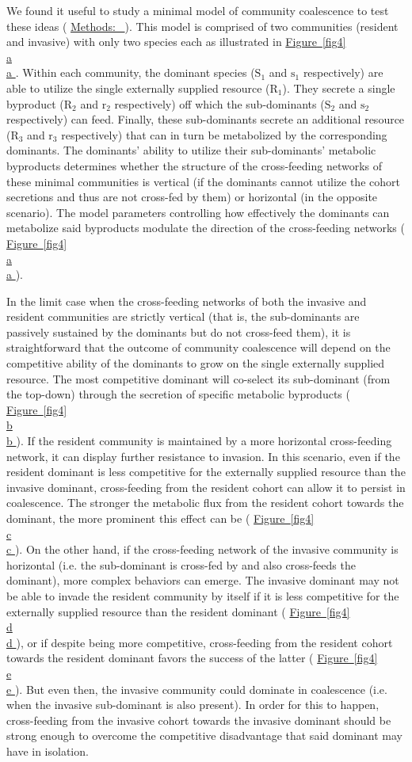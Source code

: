 \documentclass[a4paper,10pt]{article}
\newcommand{\figref}[2][]{%
  \hyperref[{#2}]{%
    Figure~\ref*{#2}%
    \ifx\\#1\\%
    \else
      #1%
    \fi
  }%
}
\newcommand{\methodsref}[1]{%
  \hyperref[{methods:#1}]{%
   Methods:~\nameref*{methods:#1}%
  }%
}
\begin{document}
We found it useful to study a minimal model of community coalescence
to test these ideas
(\methodsref{sim-min}).
This model is comprised of two communities
(resident and invasive)
with only two species each
as illustrated in \figref[a]{fig4}.
Within each community, the dominant species
($\mathrm{S}_1$ and $\mathrm{s}_1$ respectively)
are able to utilize the single externally supplied resource ($\mathrm{R}_1$).
They secrete a single byproduct
($\mathrm{R}_2$ and $\mathrm{r}_2$ respectively)
off which
the sub-dominants ($\mathrm{S}_2$ and $\mathrm{s}_2$ respectively) can feed.
Finally, these sub-dominants secrete an additional resource
($\mathrm{R}_3$ and $\mathrm{r}_3$ respectively)
that can in turn
be metabolized by the corresponding dominants.
The dominants' ability to utilize their sub-dominants' metabolic
byproducts determines whether the structure of the cross-feeding
networks of these minimal communities is vertical
(if the dominants cannot utilize the cohort secretions
and thus are not cross-fed by them)
or horizontal
(in the opposite scenario).
The model parameters controlling how effectively the dominants
can metabolize said byproducts modulate the direction of the
cross-feeding networks
(\figref[a]{fig4}).

In the limit case when the cross-feeding networks of both the invasive and resident communities
are strictly vertical (that is, the sub-dominants are passively sustained by the dominants
but do not cross-feed them),
it is straightforward that the outcome of community coalescence will depend on the competitive
ability of the dominants to grow on the single externally supplied resource.
The most competitive dominant will co-select its sub-dominant (from the top-down)
through the secretion of specific metabolic byproducts
(\figref[b]{fig4}).
If the resident community is maintained by a more horizontal cross-feeding network,
it can display further resistance to invasion.
In this scenario, even if the resident dominant is less competitive for the externally supplied resource
than the invasive dominant,
cross-feeding from the resident cohort can allow it to persist in coalescence.
The stronger the metabolic flux from the resident cohort towards the dominant,
the more prominent this effect can be
(\figref[c]{fig4}).
On the other hand, if the cross-feeding network of the invasive community is horizontal
(i.e. the sub-dominant is cross-fed by and also cross-feeds the dominant),
more complex behaviors can emerge.
The invasive dominant may not be able to invade the resident community by itself
if it is less competitive for the externally supplied resource than the resident dominant
(\figref[d]{fig4}),
or if despite being more competitive, cross-feeding from the resident cohort towards
the resident dominant favors the success of the latter
(\figref[e]{fig4}).
But even then, the invasive community could dominate in coalescence (i.e. when the invasive
sub-dominant is also present).
In order for this to happen, cross-feeding from the invasive cohort towards the invasive dominant
should be strong enough to overcome the competitive disadvantage that said dominant
may have in isolation.
\end{document}
